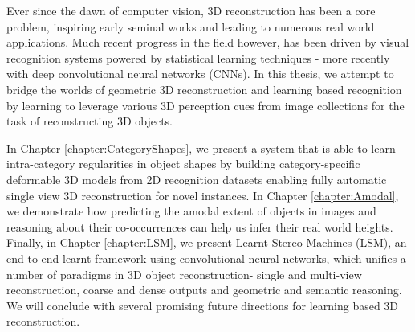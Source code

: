 

Ever since the dawn of computer vision, 3D reconstruction has been a core problem, inspiring early seminal works and leading to numerous real world applications. Much recent progress in the field however, has been driven by visual recognition systems powered by statistical learning techniques - more recently with deep convolutional neural networks (CNNs). In this thesis, we attempt to bridge the worlds of geometric 3D reconstruction and learning based recognition by learning to leverage various 3D perception cues from image collections for the task of reconstructing 3D objects.

In Chapter \ref{chapter:CategoryShapes}, we present a system that is able to learn intra-category regularities in object shapes by building category-specific deformable 3D models from 2D recognition datasets enabling fully automatic single view 3D reconstruction for novel instances. In Chapter \ref{chapter:Amodal}, we demonstrate how predicting the amodal extent of objects in images and reasoning about their co-occurrences can help us infer their real world heights. Finally, in Chapter \ref{chapter:LSM}, we present Learnt Stereo Machines (LSM), an end-to-end learnt framework using convolutional neural networks, which unifies a number of paradigms in 3D object reconstruction- single and multi-view reconstruction, coarse and dense outputs and geometric and semantic reasoning. We will conclude with several promising future directions for learning based 3D reconstruction.

